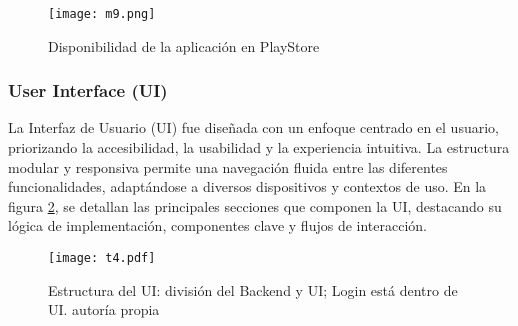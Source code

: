 \begin{figure}[h!]
\centering
  \texttt{[image: m9.png]}
  \caption{Disponibilidad de la aplicación en PlayStore}
  \label{m9}
\end{figure}










\newpage
\subsubsection{User Interface (UI)}
La Interfaz de Usuario (UI) fue diseñada con un enfoque centrado en el usuario, priorizando la accesibilidad, la usabilidad y la experiencia intuitiva. La estructura modular y responsiva permite una navegación fluida entre las diferentes funcionalidades, adaptándose a diversos dispositivos y contextos de uso. En la figura \ref{m10}, se detallan las principales secciones que componen la UI, destacando su lógica de implementación, componentes clave y flujos de interacción.

\begin{figure}[h!]
\centering
  \texttt{[image: t4.pdf]}
  \caption{Estructura del UI: división del Backend y UI; Login está dentro de UI. autoría propia}
  \label{m10}
\end{figure}



